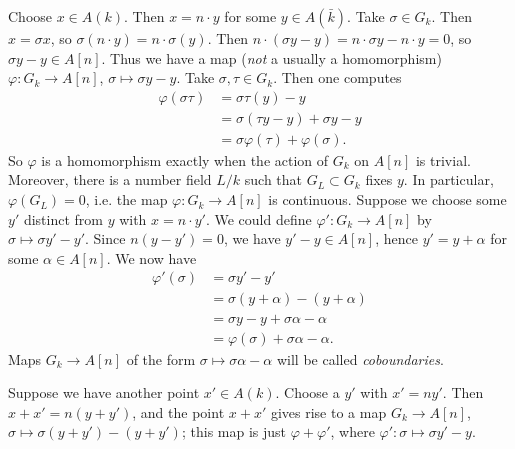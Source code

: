 Choose $x\in A(k)$. Then $x=n\cdot y$ for some $y\in A(\bar k)$. Take 
$\sigma\in G_k$. Then $x=\sigma x$, so $\sigma(n\cdot y) = n\cdot \sigma(y)$. 
Then $n\cdot (\sigma y - y) = n\cdot \sigma y - n\cdot y = 0$, so 
$\sigma y-y\in A[n]$. Thus we have a map (\emph{not} a usually a homomorphism) 
$\varphi:G_k\to A[n]$, $\sigma\mapsto \sigma y - y$. Take $\sigma,\tau\in G_k$. 
Then one computes 
\begin{align*}
  \varphi(\sigma\tau) &= \sigma\tau(y) - y \\
    &= \sigma(\tau y - y) + \sigma y -y \\
    &= \sigma\varphi(\tau) + \varphi(\sigma) \text{.}
\end{align*}
So $\varphi$ is a homomorphism exactly when the action of $G_k$ on 
$A[n]$ is trivial. Moreover, there is a number field $L/k$ such that 
$G_L\subset G_k$ fixes $y$. In particular, $\varphi(G_L)=0$, i.e. the map 
$\varphi:G_k\to A[n]$ is continuous. Suppose we choose some $y'$ distinct from 
$y$ with $x=n\cdot y'$. We could define $\varphi':G_k\to A[n]$ by 
$\sigma\mapsto \sigma y'-y'$. Since $n(y-y')=0$, we have $y'-y\in A[n]$, hence 
$y'=y+\alpha$ for some $\alpha\in A[n]$. We now have 
\begin{align*}
  \varphi'(\sigma) &= \sigma y'-y' \\
    &= \sigma(y+\alpha) - (y+\alpha) \\
    &= \sigma y - y + \sigma\alpha-\alpha \\
    &= \varphi(\sigma) + \sigma \alpha-\alpha \text{.}
\end{align*}
Maps $G_k\to A[n]$ of the form $\sigma\mapsto \sigma \alpha-\alpha$ will be 
called \emph{coboundaries}. 

Suppose we have another point $x'\in A(k)$. Choose a $y'$ with $x'=n y'$. Then 
$x+x'=n(y+y')$, and the point $x+x'$ gives rise to a map $G_k\to A[n]$, 
$\sigma\mapsto \sigma(y+y')-(y+y')$; this map is just $\varphi+\varphi'$, where 
$\varphi':\sigma\mapsto \sigma y'-y$. 

